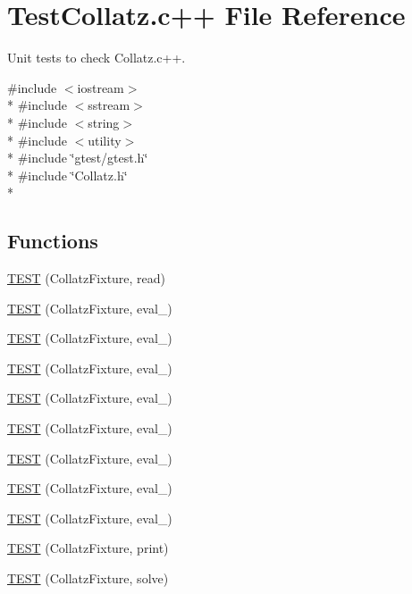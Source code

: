 \hypertarget{TestCollatz_8c_09_09}{\section{Test\-Collatz.\-c++ File Reference}
\label{TestCollatz_8c_09_09}
}


Unit tests to check Collatz.\-c++.  


{\ttfamily \#include $<$iostream$>$}\\*
{\ttfamily \#include $<$sstream$>$}\\*
{\ttfamily \#include $<$string$>$}\\*
{\ttfamily \#include $<$utility$>$}\\*
{\ttfamily \#include \char`\"{}gtest/gtest.\-h\char`\"{}}\\*
{\ttfamily \#include \char`\"{}Collatz.\-h\char`\"{}}\\*
\subsection*{Functions}
\begin{DoxyCompactItemize}
\item 
\hyperlink{TestCollatz_8c_09_09_a528303af22c7c5a550af7342092a9f05}{T\-E\-S\-T} (Collatz\-Fixture, read)
\item 
\hyperlink{TestCollatz_8c_09_09_aa0fcdadaf0d4f7fe0919c37746fe7c74}{T\-E\-S\-T} (Collatz\-Fixture, eval\-\_)
\item 
\hyperlink{TestCollatz_8c_09_09_a333bb6921f06fa177e9818dbcf3eda06}{T\-E\-S\-T} (Collatz\-Fixture, eval\-\_)
\item 
\hyperlink{TestCollatz_8c_09_09_a251001c75c1226c607534268ab3a5bcb}{T\-E\-S\-T} (Collatz\-Fixture, eval\-\_)
\item 
\hyperlink{TestCollatz_8c_09_09_a033aa388470c35adc9579303dba1afa2}{T\-E\-S\-T} (Collatz\-Fixture, eval\-\_)
\item 
\hyperlink{TestCollatz_8c_09_09_ab529bbfe532bd0b6fbc11c51fe0af7e5}{T\-E\-S\-T} (Collatz\-Fixture, eval\-\_)
\item 
\hyperlink{TestCollatz_8c_09_09_adebb7237f2a00c256cd0c733885ccd58}{T\-E\-S\-T} (Collatz\-Fixture, eval\-\_)
\item 
\hyperlink{TestCollatz_8c_09_09_a4428eb890eb2825bcd806812ccf3edc3}{T\-E\-S\-T} (Collatz\-Fixture, eval\-\_)
\item 
\hyperlink{TestCollatz_8c_09_09_ad31ddf657ad806c35457117d9a862a43}{T\-E\-S\-T} (Collatz\-Fixture, eval\-\_)
\item 
\hyperlink{TestCollatz_8c_09_09_a1be21485425cf43808a497ed8ef4d418}{T\-E\-S\-T} (Collatz\-Fixture, print)
\item 
\hyperlink{TestCollatz_8c_09_09_a07f06cda216730b4038ffd06db5a3d1f}{T\-E\-S\-T} (Collatz\-Fixture, solve)
\end{DoxyCompactItemize}


